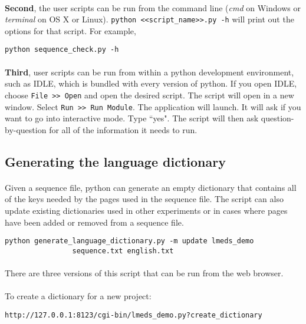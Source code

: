 \paragraph{}
\textbf{Second}, the user scripts can be run from the command line (\textit{cmd} on Windows or \textit{terminal} on OS X or Linux).  \texttt{python <<script\_name>>.py -h} will print out the options for that script.  For example, 
\begin{lstlisting}
python sequence_check.py -h
\end{lstlisting}

\paragraph{}
\textbf{Third}, user scripts can be run from within a python development environment, such as IDLE, which is bundled with every version of python.  If you open IDLE, choose \texttt{File >> Open} and open the desired script.  The script will open in a new window.  Select \texttt{Run >> Run Module}.  The application will launch.  It will ask if you want to go into interactive mode.  Type ``yes".  The script will then ask question-by-question for all of the information it needs to run.

\subsection{Generating the language dictionary}

\paragraph{}
Given a sequence file, python can generate an empty dictionary that contains all of the keys needed by the pages used in the sequence file.  The script can also update existing dictionaries used in other experiments or in cases where pages have been added or removed from a sequence file.

\begin{lstlisting}
python generate_language_dictionary.py -m update lmeds_demo 
				sequence.txt english.txt
\end{lstlisting}

\paragraph{}
There are three versions of this script that can be run from the web browser.

\paragraph{}
To create a dictionary for a new project:
\begin{lstlisting}
http://127.0.0.1:8123/cgi-bin/lmeds_demo.py?create_dictionary
\end{lstlisting}


